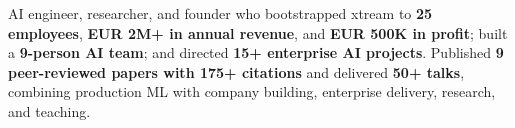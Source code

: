 \documentclass[10pt,a4paper]{awesome-cv}
\begin{document}
\makecvheader[C]


\begin{cvparagraph}
AI engineer, researcher, and founder who bootstrapped xtream to \textbf{25 employees}, \textbf{EUR 2M+ in annual revenue}, and \textbf{EUR 500K in profit}; built a \textbf{9-person AI team}; and directed \textbf{15+ enterprise AI projects}. Published \textbf{9 peer-reviewed papers with 175+ citations} and delivered \textbf{50+ talks}, combining production ML with company building, enterprise delivery, research, and teaching.
\end{cvparagraph}


\begin{cvskills}
\end{cvskills}

\end{document}
